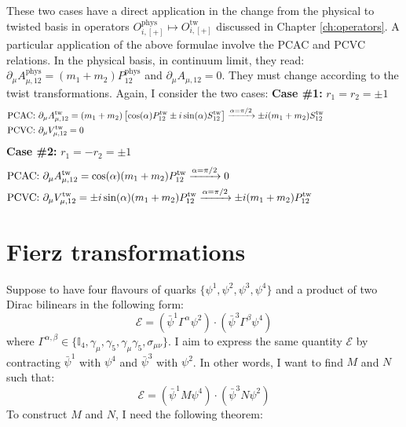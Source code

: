 \documentclass[english, LaM, oneside, noexaminfo]{sapthesis}
\begin{document}
These two cases have a direct application in the change from the physical to twisted basis in operators $O_{i,[+]}^\text{phys} \mapsto O_{i,[+]}^\text{tw}$ discussed in Chapter \ref{ch:operators}.
\newline
A particular application of the above formulae involve the PCAC and PCVC relations.
In the physical basis, in continuum limit, they read: $\partial_\mu A_{\mu,12}^\text{phys} = (m_1+m_2)P_{12}^\text{phys}$ and $\partial_\mu A_{\mu,12} = 0$.
They must change according to the twist transformations.
Again, I consider the two cases:
\newline
\newline
{\bf Case \#1: } $r_1 = r_2 = \pm 1$
\begin{equation*}
    \begin{aligned}
        & \text{PCAC: } \partial_\mu A_{\mu,12}^\text{tw} = (m_1+m_2)\left[\cos (\alpha) P_{12}^\text{tw} \pm i \sin (\alpha) S_{12}^\text{tw}\right] \xrightarrow{\alpha = \pi/2} \pm i (m_1+m_2) S^\text{tw}_{12} \hspace*{3cm}\\
        & \text{PCVC: } \partial_\mu V_{\mu,12}^\text{tw} = 0
    \end{aligned}
\end{equation*}
\newline
{\bf Case \#2: } $r_1 = - r_2 = \pm 1$
\begin{equation*}
    \begin{aligned}
        & \text{PCAC: } \partial_\mu A_{\mu,12}^\text{tw} = \cos (\alpha) (m_1+m_2) P_{12}^\text{tw} \xrightarrow{\alpha = \pi/2} 0 \\
        & \text{PCVC: } \partial_\mu V_{\mu,12}^\text{tw} = \pm i \sin (\alpha) (m_1+m_2) P_{12}^\text{tw} \xrightarrow{\alpha = \pi/2} \pm i (m_1+m_2) P_{12}^\text{tw} \hspace*{3cm}
    \end{aligned}
\end{equation*}

\chapter{Fierz transformations}\label{app:fierz}
\noindent
Suppose to have four flavours of quarks $\{\psi^1,\psi^2,\psi^3,\psi^4\}$ and a product of two Dirac bilinears in the following form:
\begin{equation*}
    \mathcal{E} = \left(\bar\psi^1 \Gamma^\alpha \psi^2 \right)\cdot\left(\bar\psi^3 \Gamma^\beta \psi^4 \right)
\end{equation*}
where $\Gamma^{\alpha,\beta} \in \{\mathbb{I}_4,\gamma_\mu, \gamma_5, \gamma_\mu\gamma_5, \sigma_{\mu\nu} \}$.
I aim to express the same quantity $\mathcal{E}$ by contracting $\bar\psi^1$ with $\psi^4$ and $\bar\psi^3$ with $\psi^2$.
In other words, I want to find $M$ and $N$ such that:
\begin{equation*}
    \mathcal{E} = \left(\bar\psi^1 M \psi^4 \right)\cdot\left(\bar\psi^3 N \psi^2 \right)
\end{equation*} 
To construct $M$ and $N$, I need the following theorem:
\end{document}
